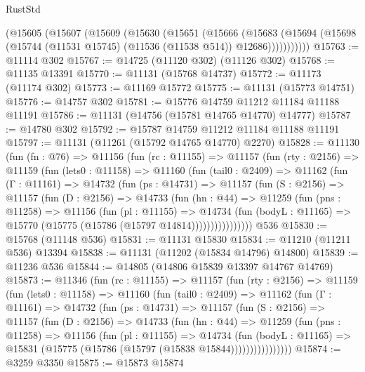 \begin{lexlean}{RustStd}
\begin{coremodule}
      (@15605
        (@15607
          (@15609
            (@15630
              (@15651
                (@15666
                  (@15683
                    (@15694 (@15698 (@15744 (@11531 @15745) (@11536 (@11538 @514)) @12686)))))))))))
@15763 := @11114 @302
@15767 := @14725 (@11120 @302) (@11126 @302)
@15768 := @11135 @13391
@15770 := @11131 (@15768 @14737)
@15772 := @11173 (@11174 @302)
@15773 := @11169 @15772
@15775 := @11131 (@15773 @14751)
@15776 := @14757 @302
@15781 := @15776 @14759 @11212 @11184 @11188 @11191
@15786 := @11131 (@14756 (@15781 @14765 @14770) @14777)
@15787 := @14780 @302
@15792 := @15787 @14759 @11212 @11184 @11188 @11191
@15797 := @11131 (@11261 (@15792 @14765 @14770) @2270)
@15828 := @11130
    (fun (fn : @76) =>
    @11156
      (fun (rc : @11155) =>
      @11157
        (fun (rty : @2156) =>
        @11159
          (fun (lets0 : @11158) =>
          @11160
            (fun (tail0 : @2409) =>
            @11162
              (fun (Γ : @11161) =>
              @14732
                (fun (ps : @14731) =>
                @11157
                  (fun (S : @2156) =>
                  @11157
                    (fun (D : @2156) =>
                    @14733
                      (fun (hn : @44) =>
                      @11259
                        (fun (pns : @11258) =>
                        @11156
                          (fun (pl : @11155) =>
                          @14734
                            (fun (bodyL : @11165) =>
                            @15770 (@15775 (@15786 (@15797 @14814))))))))))))))))
    @536
@15830 := @15768 (@11148 @536)
@15831 := @11131 @15830
@15834 := @11210 (@11211 @536) @13394
@15838 := @11131 (@11202 (@15834 @14796) @14800)
@15839 := @11236 @536
@15844 := @14805 (@14806 @15839 @13397 @14767 @14769)
@15873 := @11346
    (fun (rc : @11155) =>
    @11157
      (fun (rty : @2156) =>
      @11159
        (fun (lets0 : @11158) =>
        @11160
          (fun (tail0 : @2409) =>
          @11162
            (fun (Γ : @11161) =>
            @14732
              (fun (ps : @14731) =>
              @11157
                (fun (S : @2156) =>
                @11157
                  (fun (D : @2156) =>
                  @14733
                    (fun (hn : @44) =>
                    @11259
                      (fun (pns : @11258) =>
                      @11156
                        (fun (pl : @11155) =>
                        @14734
                          (fun (bodyL : @11165) =>
                          @15831 (@15775 (@15786 (@15797 (@15838 @15844))))))))))))))))
@15874 := @3259 @3350
@15875 := @15873 @15874

\end{coremodule}
\end{lexlean}
